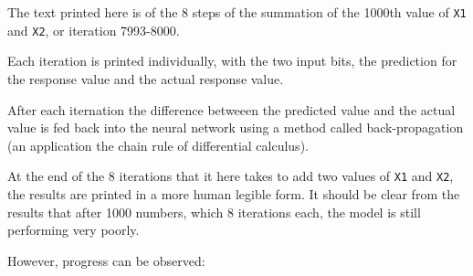 \documentclass[british]{article}\usepackage[]{graphicx}\usepackage[]{color}
\newcommand{\code}[1]{\texttt{#1}}
\begin{document}
The text printed here is of the 8 steps of the summation of the 1000th
value of \code{X1} and \code{X2}, or iteration 7993-8000.

Each iteration is printed individually, with the two input bits, the
prediction for the response value and the actual response value.

After each iternation the difference betweeen the predicted value
and the actual value is fed back into the neural network using a method
called back-propagation (an application the chain rule of differential
calculus).

At the end of the 8 iterations that it here takes to add two values
of \code{X1} and \code{X2}, the results are printed in a more human
legible form. It should be clear from the results that after 1000
numbers, which 8 iterations each, the model is still performing very
poorly.

However, progress can be observed:
\end{document}
